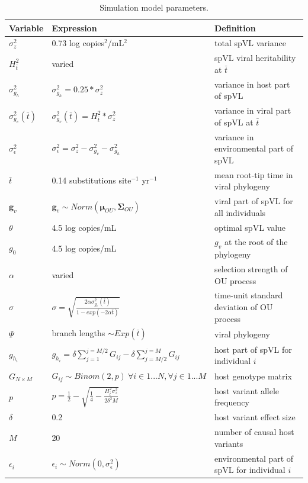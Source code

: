 \documentclass[]{article}
\begin{document}
\begin{doublespace}
\begin{table}[H]
	\begin{tabular}{p{1.5cm}ll} \toprule 
		Variable & Expression & Definition \\ \midrule 
		$\sigma^2_z$ &  0.73 log copies$^{2}$/mL$^{2}$ & total spVL variance \\ 
		$H^2_{\bar{t}}$ & varied & spVL viral heritability at $\bar{t}$ \\
		$\sigma^2_{g_h}$ & $\sigma_{g_h}^2 = 0.25*\sigma_z^2$ & variance in host part of spVL \\
		$\sigma^2_{g_v}(\bar{t})$ & $\sigma^2_{g_{v}}(\bar{t}) = H^2_{\bar{t}}*\sigma_z^2$ & variance in viral part of spVL at $\bar{t}$ \\ 
		$\sigma^2_{\epsilon}$ & $\sigma_{\epsilon}^2 = \sigma_z^2 - \sigma^2_{g_v} - \sigma^2_{g_h}$ & variance in environmental part of spVL \\ 
		$\bar{t}$ & 0.14 substitutions site$^{-1}$ yr$^{-1}$ & mean root-tip time in viral phylogeny \\ 
		$\bm{g}_v$ & $\bm{g}_v \sim Norm(\bm{\mu}_{OU}, \boldsymbol{\Sigma}_{OU})$ & viral part of spVL for all individuals \\ 
		$\theta$ & 4.5 log copies/mL & optimal spVL value \\
		$g_{0}$ & 4.5 log copies/mL & $g_v$ at the root of the phylogeny  \\ 
		$\alpha$ & varied & selection strength of OU process \\ 
		$\sigma$ & $\sigma = \sqrt{\frac{2\alpha\sigma^2_{g_{v}}(\bar{t})}{1 - exp(-2\alpha\bar{t})}}$ & time-unit standard deviation of OU process \\ 
		$\Psi$ & branch lengths $\sim Exp(\bar{t})$ & viral phylogeny \\ 
		$g_{h_i}$ & $g_{h_i} = \delta \sum_{j = 1}^{j = M/2}{G_{ij}} - \delta \sum_{j = M/2}^{j = M}{G_{ij}}$ & host part of spVL for individual $i$ \\ 
		$G_{N \times M}$ & $G_{ij} \sim Binom(2, p)\ \forall i \in {1...N}, \forall j \in {1...M}$ & host genotype matrix \\
		$p$ & $p = \frac{1}{2} - \sqrt{\frac{1}{4} - \frac{H_{\bar{t}}^2\sigma^2_z}{2\delta^2M}}$ &  host variant allele frequency \\ 
		$\delta$ & 0.2 & host variant effect size \\ 
		$M$ & 20 & number of causal host variants \\ 
		$\epsilon_i$ & $ \epsilon_i \sim Norm(0, \sigma^2_{\epsilon})$ & environmental part of spVL for individual $i$ \\ \bottomrule 
	\end{tabular}
	\caption{Simulation model parameters.}
	\label{tab:sim-params}
\end{table}


\end{doublespace}
\end{document}
